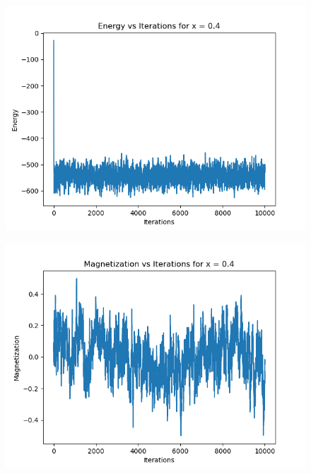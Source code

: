 \documentclass[12pt]{article}
\begin{document}
\newpage
\begin{figure}
  \centering
  \includegraphics[max width=\textwidth]{energy_vs_iterations_0.4.png}
\end{figure}
\begin{figure}
  \centering
  \includegraphics[max width=\textwidth]{magnetization_vs_iterations_0.4.png}
\end{figure}
\end{document}
